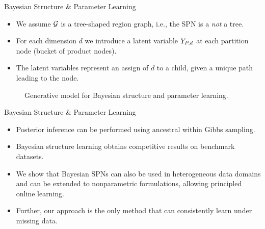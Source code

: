 \begin{frame}{Bayesian Structure \& Parameter Learning}
\begin{itemize}
    \item We assume $\mathcal{G}$ is a tree-shaped region graph, i.e., the SPN is a \emph{not} a tree.
    \item For each dimension $d$ we introduce a latent variable $Y_{P,d}$ at each partition node (bucket of product nodes).
    \item The latent variables represent an assign of $d$ to a child, given a unique path leading to the node.
\end{itemize}

\begin{figure}
    \centering
    \caption{Generative model for Bayesian structure and parameter learning.}\label{fig:BSPN}
\end{figure}
\end{frame}

\begin{frame}{Bayesian Structure \& Parameter Learning}
    \begin{itemize}
        \item Posterior inference can be performed using ancestral within Gibbs sampling.
        \item Bayesian structure learning obtains competitive results on benchmark datasets.
        \item We show that Bayesian SPNs can also be used in heterogeneous data domains and can be extended to nonparametric formulations, allowing principled online learning.
        \item Further, our approach is the only method that can consistently learn under missing data.
    \end{itemize}
\end{frame}


